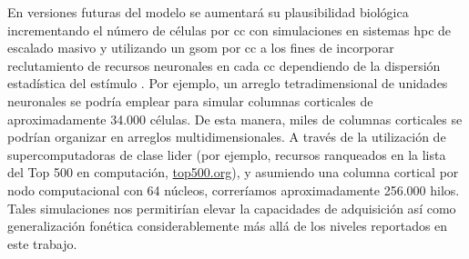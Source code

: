 En versiones futuras del modelo se aumentará su plausibilidad biológica incrementando el número de células por \gls{cc} con simulaciones en sistemas \gls{hpc} de escalado masivo y utilizando un \gls{gsom} por \gls{cc} a los fines de incorporar reclutamiento de recursos neuronales en cada \gls{cc} dependiendo de la dispersión estadística del estímulo \cite{Meyer19113}. Por ejemplo, un arreglo tetradimensional de unidades neuronales se podría emplear para simular columnas corticales de aproximadamente 34.000 células. De esta manera, miles de columnas corticales se podrían organizar en arreglos multidimensionales. A través de la utilización de supercomputadoras de clase lider (por ejemplo, recursos ranqueados en la lista del Top 500 en computación, \url{top500.org}), y asumiendo una columna cortical por nodo computacional con 64 núcleos, correríamos aproximadamente 256.000 hilos. Tales simulaciones nos permitirían elevar la capacidades de adquisición así como generalización fonética considerablemente más allá de los niveles reportados en este trabajo.








